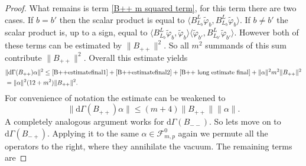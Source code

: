 \documentclass[b5paper,draft,openbib,12pt]{memoir}
\begin{document}
\begin{proof}
What remains is term \eqref{B++ m squared term}, for this term there are two cases.  If \(b=b'\) then the scalar product is 
equal to \(\langle B_{L_b}^L \tilde{\varphi}_b, B_{L_{b}}^L \tilde{\varphi}_{b}\rangle\). If \(b\neq b'\) the scalar product is, up to a sign,
equal to \(\langle B_{L_b}^L \tilde{\varphi}_b,\tilde{\varphi}_{b}\rangle \langle \tilde{\varphi}_{b'}, B_{L_{b'}}^L \tilde{\varphi}_{b'}\rangle\).
However both of these terms can be estimated by \(\|B_{++}\|^2\). So all \(m^2\) summands of this sum contribute \(\|B_{++}\|^2\). Overall 
this estimate yields
\begin{align}\nonumber
&\|\mathrm{d}\Gamma(B_{++})\alpha\|^2 \le \eqref{B++estimatefinal1}+\eqref{B++estimatefinal2}+\eqref{B++ long estimate final} + \|\alpha\|^2 m^2 \|B_{++}\|^2 \\\nonumber
&= \|\alpha\|^2 (12+m^2) \|B_{++}\|^2.
\end{align}
For convenience of notation the estimate can be weakened to 
\begin{equation}
\|\mathrm{d}\Gamma(B_{++})\alpha\| \le (m+4) \|B_{++}\|\|\alpha\|.
\end{equation}
A completely analogous argument works for 
\(\mathrm{d}\Gamma(B_{--})\). 
So lets move on to \(\mathrm{d}\Gamma(B_{-+})\). Applying it 
to the same \(\alpha\in \mathcal{F}^0_{m,p}\) again we 
permute all the operators
to the right, where they annihilate the vacuum. The remaining 
terms are


\end{proof}
\end{document}
